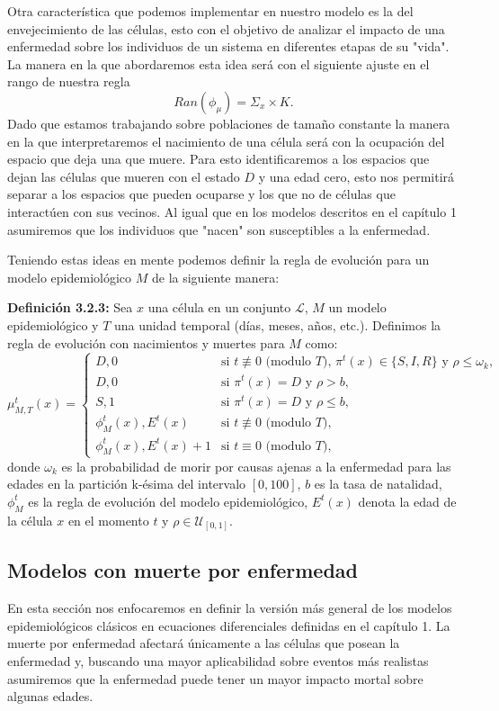 Otra característica que podemos implementar en nuestro modelo es la del envejecimiento de las células, esto con el objetivo de analizar el impacto de una enfermedad sobre los individuos de un sistema en diferentes etapas de su "vida". La manera en la que abordaremos esta idea será con el siguiente ajuste en el rango de nuestra regla
$$Ran(\phi_\mu)=\Sigma_x\times K.$$
Dado que estamos trabajando sobre poblaciones de tamaño constante la manera en la que interpretaremos el nacimiento de una célula será con la ocupación del espacio que deja una que muere. Para esto identificaremos a los espacios que dejan las células que mueren con el estado $D$ y una edad cero, esto nos permitirá separar a los espacios que pueden ocuparse y los que no de células que interactúen con sus vecinos. Al igual que en los modelos descritos en el capítulo 1 asumiremos que los individuos que "nacen" son susceptibles a la enfermedad.

Teniendo estas ideas en mente podemos definir la regla de evolución para un modelo epidemiológico $M$ de la siguiente manera:

\textbf{Definición 3.2.3:} Sea $x$ una célula en un conjunto $\mathcal{L}$, $M$ un modelo epidemiológico y $T$ una unidad temporal (días, meses, años, etc.). Definimos la regla de evolución con nacimientos y muertes para $M$ como:
\begin{equation}
    \mu_{M,T}^t(x)=\left\{\begin{array}{ll}
        D,0 & \text{si }t\not\equiv 0 \text{ (modulo }T\text{), }\pi^t(x)\in\{S,I,R\}\text{ y }\rho\leq\omega_k, \\
        D,0 & \text{si }\pi^t(x)=D\text{ y }\rho>b,\\
        S,1 & \text{si }\pi^t(x)=D\text{ y }\rho\leq b,\\
        \phi_M^t(x),E^t(x) & \text{si }t\not\equiv 0 \text{ (modulo }T),\\
        \phi_M^t(x),E^t(x)+1 & \text{si }t\equiv 0 \text{ (modulo }T),
    \end{array}\right.
\end{equation}
donde $\omega_k$ es la probabilidad de morir por causas ajenas a la enfermedad para las edades en la partición k-ésima del intervalo $[0,100]$, $b$ es la tasa de natalidad, $\phi_M^t$ es la regla de evolución del modelo epidemiológico, $E^t(x)$ denota la edad de la célula $x$ en el momento $t$ y $\rho\in\mathcal{U}_{[0,1]}$.
\subsection{Modelos con muerte por enfermedad}
En esta sección nos enfocaremos en definir la versión más general de los modelos epidemiológicos clásicos en ecuaciones diferenciales definidas en el capítulo 1. La muerte por enfermedad afectará únicamente a las células que posean la enfermedad y, buscando una mayor aplicabilidad sobre eventos más realistas asumiremos que la enfermedad puede tener un mayor impacto mortal sobre algunas edades. 


